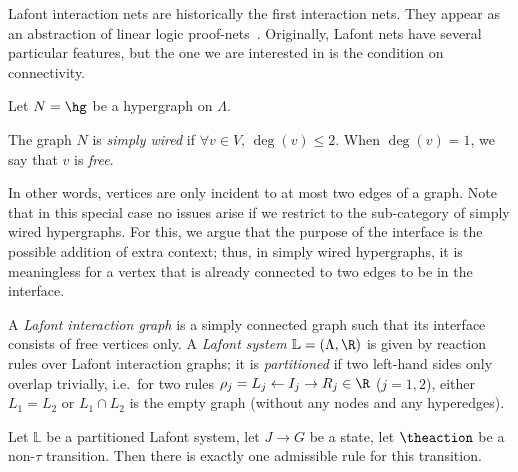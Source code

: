 \begin{example}
  Lafont interaction nets are historically the first interaction nets. 
  They appear as an abstraction of linear logic proof-nets~\cite{Laf95}.
  Originally, 
  Lafont nets have several particular features, but the one we are interested in is the condition on connectivity.
\begin{definition}
  Let $N = \hg$ be a hypergraph on $\Lambda$.


  The graph $N$ is \emph{simply wired} if $\forall v \in V$, $\deg(v) \leq 2$.
  When $\deg(v) = 1$, 
  we say that $v$ is \emph{free}.
\end{definition}

In other words, vertices are only incident to  at most two edges of a graph.
Note that in this special case 
no issues arise if we restrict to the sub-category of simply wired hypergraphs.
For this, we argue that the purpose of the interface is the possible addition of extra context; 
thus, in simply wired hypergraphs, 
it is meaningless for a vertex that is already connected to two edges to be in the interface.

\begin{definition}
  A \emph{Lafont interaction graph} is a simply connected graph such that its interface consists  of free vertices only.
  A \emph{Lafont system} $\mathbb L = (\Lambda,\R)$ is given by  reaction rules over Lafont interaction graphs;
  it is \emph{partitioned} if two left-hand sides only overlap trivially, 
  i.e.\ for two rules $\rho_j = L_j \leftarrow I_j \rightarrow R_j \in \R$ ($j=1,2$), 
  either $L_1 = L_2$ or $L_1 \cap L_2$ is the empty graph (without any nodes and any hyperedges). 
\end{definition}

\begin{lemma}
  Let $\mathbb L$ be a partitioned Lafont system, 
  let $J \rightarrow G$ be a state, let $\theaction$ be a non-$\tau$ transition.
  Then there is exactly one  admissible rule for this transition.
\label{lem:therule1}
\end{lemma}
\end{example}



